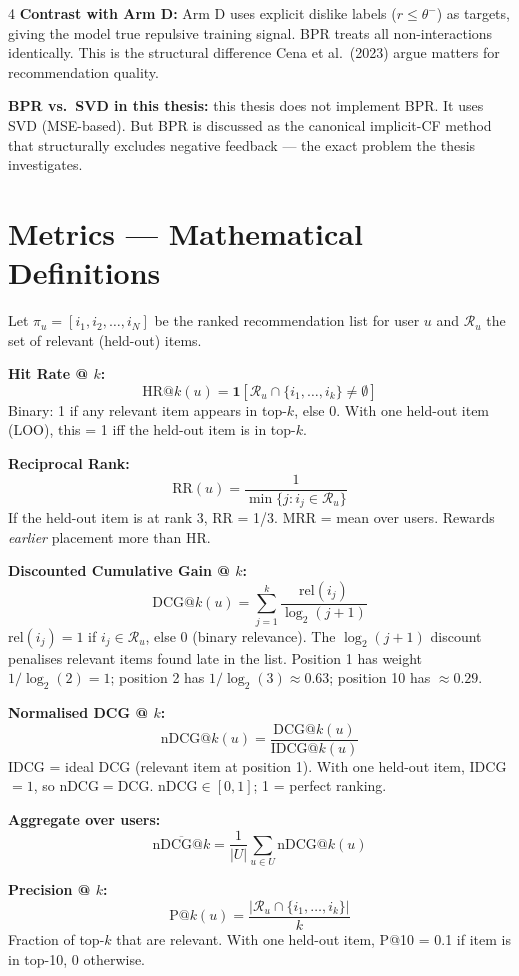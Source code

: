\documentclass[9pt,a4paper,landscape]{article}
\begin{document}
\begin{multicols}{4}
\textbf{Contrast with Arm D:} Arm D uses explicit dislike labels ($r\leq\theta^-$) as targets, giving the model true repulsive training signal. BPR treats all non-interactions identically. This is the structural difference Cena et al.\ (2023) argue matters for recommendation quality.

\textbf{BPR vs.\ SVD in this thesis:} this thesis does not implement BPR. It uses SVD (MSE-based). But BPR is discussed as the canonical implicit-CF method that structurally excludes negative feedback — the exact problem the thesis investigates.

\section{Metrics — Mathematical Definitions}

Let $\pi_u = [i_1, i_2, \ldots, i_N]$ be the ranked recommendation list for user $u$ and $\mathcal{R}_u$ the set of relevant (held-out) items.

\textbf{Hit Rate @ $k$:}
\[
\text{HR@}k(u) = \mathbf{1}[\mathcal{R}_u \cap \{i_1,\ldots,i_k\} \neq \emptyset]
\]
Binary: 1 if any relevant item appears in top-$k$, else 0. With one held-out item (LOO), this = 1 iff the held-out item is in top-$k$.

\textbf{Reciprocal Rank:}
\[
\text{RR}(u) = \frac{1}{\min\{j : i_j \in \mathcal{R}_u\}}
\]
If the held-out item is at rank 3, RR = 1/3. MRR = mean over users. Rewards \emph{earlier} placement more than HR.

\textbf{Discounted Cumulative Gain @ $k$:}
\[
\text{DCG@}k(u) = \sum_{j=1}^{k} \frac{\text{rel}(i_j)}{\log_2(j+1)}
\]
$\text{rel}(i_j) = 1$ if $i_j \in \mathcal{R}_u$, else 0 (binary relevance). The $\log_2(j+1)$ discount penalises relevant items found late in the list. Position 1 has weight $1/\log_2(2)=1$; position 2 has $1/\log_2(3)\approx 0.63$; position 10 has $\approx 0.29$.

\textbf{Normalised DCG @ $k$:}
\[
\text{nDCG@}k(u) = \frac{\text{DCG@}k(u)}{\text{IDCG@}k(u)}
\]
IDCG = ideal DCG (relevant item at position 1). With one held-out item, IDCG$=1$, so nDCG$=$DCG. nDCG$\in[0,1]$; 1 = perfect ranking.

\textbf{Aggregate over users:}
\[
\overline{\text{nDCG@}k} = \frac{1}{|U|}\sum_{u\in U}\text{nDCG@}k(u)
\]

\textbf{Precision @ $k$:}
\[
\text{P@}k(u) = \frac{|\mathcal{R}_u \cap \{i_1,\ldots,i_k\}|}{k}
\]
Fraction of top-$k$ that are relevant. With one held-out item, P@10 = 0.1 if item is in top-10, 0 otherwise.


\end{multicols}
\end{document}
